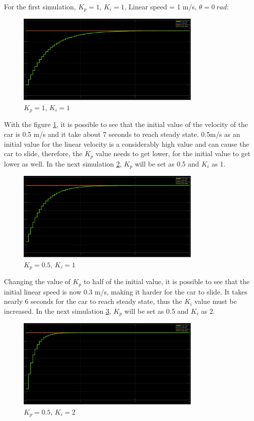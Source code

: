 For the first simulation, $K_p = 1$, $K_i = 1$, Linear speed = 1 m/s, $\theta = 0~\si{rad}$:
\begin{figure}[!h]
\centering
\includegraphics[width=0.8\textwidth]{./img/pid11.png}
\caption {\label{fig:pid1-p1i1}$K_p=1$, $K_i=1$}
\end{figure}
With the figure \ref{fig:pid1-p1i1}, it is possible to see that the initial value of the velocity of the car is 0.5 m/s and it take about 7 seconds to reach steady state. 0.5m/s as an initial value for the linear velocity is a considerably high value and can cause the car to slide, therefore, the $K_p$ value needs to get lower, for the initial value to get lower as well.
In the next simulation \ref{fig:pid1-p05i1}, $K_p$ will be set as 0.5 and $K_i$ as 1.
\begin{figure}[!h]
\centering
\includegraphics[width=0.8\textwidth]{./img/pid051.png}
\caption {\label{fig:pid1-p05i1}$K_p=0.5$, $K_i=1$}
\end{figure}
Changing the value of $K_p$ to half of the initial value, it is possible to see that the initial linear speed is now 0.3 m/s, making it harder for the car to slide. It takes nearly 6 seconds for the car to reach steady state, thus the $K_i$ value must be increased.
In the next simulation \ref{fig:pid1 - p05i2}, $K_p$ will be set as 0.5 and $K_i$ as 2.
\begin{figure}[!h]
\centering
\includegraphics[width=0.8\textwidth]{./img/pid052.png}
\caption {\label{fig:pid1 - p05i2}$K_p=0.5$, $K_i=2$}
\end{figure}
